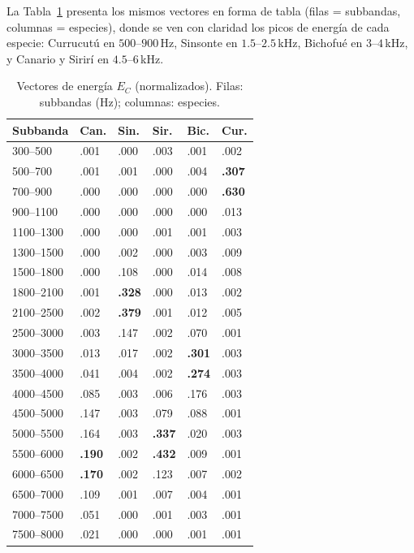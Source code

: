 \documentclass[conference]{IEEEtran}
\begin{document}
La Tabla~\ref{tab:ec} presenta los mismos vectores en forma de tabla (filas =
subbandas, columnas = especies), donde se ven con claridad los picos de energía
de cada especie: Currucutú en $500$--$900$\,Hz, Sinsonte en $1.5$--$2.5$\,kHz,
Bichofué en $3$--$4$\,kHz, y Canario y Sirirí en $4.5$--$6$\,kHz.

\begin{table}[!t]
\caption{Vectores de energía $E_C$ (normalizados). Filas: subbandas (Hz);
columnas: especies.}
\label{tab:ec}
\centering
\renewcommand{\arraystretch}{1.05}
\footnotesize
\begin{tabularx}{\columnwidth}{@{}l *{5}{>{\centering\arraybackslash}X}@{}}
\toprule
\textbf{Subbanda} & \textbf{Can.} & \textbf{Sin.} & \textbf{Sir.} & \textbf{Bic.} & \textbf{Cur.} \\
\midrule
300--500   & .001 & .000 & .003 & .001 & .002 \\
500--700   & .001 & .001 & .000 & .004 & \textbf{.307} \\
700--900   & .000 & .000 & .000 & .000 & \textbf{.630} \\
900--1100  & .000 & .000 & .000 & .000 & .013 \\
1100--1300 & .000 & .000 & .001 & .001 & .003 \\
1300--1500 & .000 & .002 & .000 & .003 & .009 \\
1500--1800 & .000 & .108 & .000 & .014 & .008 \\
1800--2100 & .001 & \textbf{.328} & .000 & .013 & .002 \\
2100--2500 & .002 & \textbf{.379} & .001 & .012 & .005 \\
2500--3000 & .003 & .147 & .002 & .070 & .001 \\
3000--3500 & .013 & .017 & .002 & \textbf{.301} & .003 \\
3500--4000 & .041 & .004 & .002 & \textbf{.274} & .003 \\
4000--4500 & .085 & .003 & .006 & .176 & .003 \\
4500--5000 & .147 & .003 & .079 & .088 & .001 \\
5000--5500 & .164 & .003 & \textbf{.337} & .020 & .003 \\
5500--6000 & \textbf{.190} & .002 & \textbf{.432} & .009 & .001 \\
6000--6500 & \textbf{.170} & .002 & .123 & .007 & .002 \\
6500--7000 & .109 & .001 & .007 & .004 & .001 \\
7000--7500 & .051 & .000 & .001 & .003 & .001 \\
7500--8000 & .021 & .000 & .000 & .001 & .001 \\
\bottomrule
\end{tabularx}
\end{table}
\end{document}
